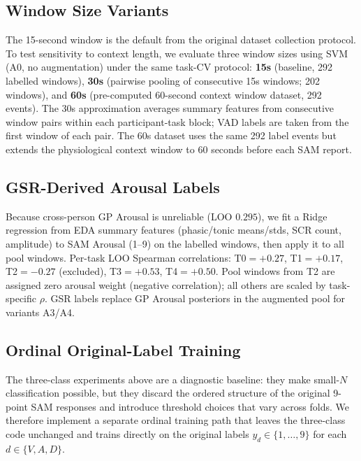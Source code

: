 \documentclass[sigconf,nonacm]{acmart}
\begin{document}
\subsection{Window Size Variants}
\label{sec:window_variants}

The 15-second window is the default from the original dataset collection
protocol.
To test sensitivity to context length, we evaluate three window sizes
using SVM (A0, no augmentation) under the same task-CV protocol:
\textbf{15s} (baseline, 292 labelled windows),
\textbf{30s} (pairwise pooling of consecutive 15s windows; 202 windows),
and \textbf{60s} (pre-computed 60-second context window dataset, 292 events).
The 30s approximation averages summary features from consecutive window pairs
within each participant-task block; VAD labels are taken from the first
window of each pair.
The 60s dataset uses the same 292 label events but extends the physiological
context window to 60 seconds before each SAM report.

\subsection{GSR-Derived Arousal Labels}
\label{sec:gsr_arousal}

Because cross-person GP Arousal is unreliable (LOO $0.295$), we fit a Ridge
regression from EDA summary features (phasic/tonic means/stds, SCR count,
amplitude) to SAM Arousal (1--9) on the labelled windows, then apply it to
all pool windows.
Per-task LOO Spearman correlations: T0$=+0.27$, T1$=+0.17$, T2$=-0.27$
(excluded), T3$=+0.53$, T4$=+0.50$.
Pool windows from T2 are assigned zero arousal weight (negative correlation);
all others are scaled by task-specific $\rho$.
GSR labels replace GP Arousal posteriors in the augmented pool for variants A3/A4.

\subsection{Ordinal Original-Label Training}
\label{sec:ordinal}

The three-class experiments above are a diagnostic baseline: they make small-$N$
classification possible, but they discard the ordered structure of the original
9-point SAM responses and introduce threshold choices that vary across folds.
We therefore implement a separate ordinal training path that leaves the
three-class code unchanged and trains directly on the original labels
$y_d \in \{1,\ldots,9\}$ for each $d \in \{V,A,D\}$.
\end{document}
